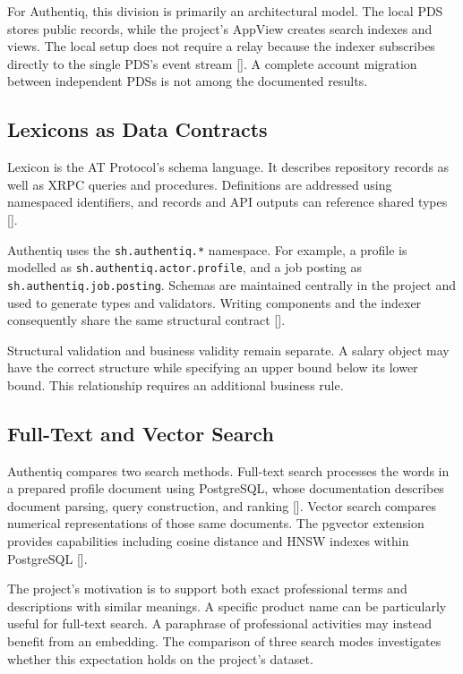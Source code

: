 \documentclass[11pt,a4paper]{article}
\newcommand{\code}[1]{\texttt{#1}}
\newcommand{\reflink}[1]{\hyperlink{ref:#1}{#1}}
\newcommand{\refsep}{}
\newcommand{\refs}[1]{\begingroup
  \gdef\refsep{}%
  \renewcommand*{\do}[1]{\refsep\reflink{##1}\gdef\refsep{, }}%
  [\docsvlist{#1}]\endgroup}
\begin{document}
For Authentiq, this division is primarily an architectural model. The local PDS stores public records, while the project's AppView creates search indexes and views. The local setup does not require a relay because the indexer subscribes directly to the single PDS's event stream \refs{P2,P4}. A complete account migration between independent PDSs is not among the documented results.

\subsection{Lexicons as Data Contracts}

Lexicon is the AT Protocol's schema language. It describes repository records as well as XRPC queries and procedures. Definitions are addressed using namespaced identifiers, and records and API outputs can reference shared types \refs{L2}.

Authentiq uses the \code{sh.authentiq.*} namespace. For example, a profile is modelled as \code{sh.authentiq.actor.profile}, and a job posting as \code{sh.authentiq.job.posting}. Schemas are maintained centrally in the project and used to generate types and validators. Writing components and the indexer consequently share the same structural contract \refs{P3,P4}.

Structural validation and business validity remain separate. A salary object may have the correct structure while specifying an upper bound below its lower bound. This relationship requires an additional business rule.

\subsection{Full-Text and Vector Search}

Authentiq compares two search methods. Full-text search processes the words in a prepared profile document using PostgreSQL, whose documentation describes document parsing, query construction, and ranking \refs{L14}. Vector search compares numerical representations of those same documents. The pgvector extension provides capabilities including cosine distance and HNSW indexes within PostgreSQL \refs{L3}.

The project's motivation is to support both exact professional terms and descriptions with similar meanings. A specific product name can be particularly useful for full-text search. A paraphrase of professional activities may instead benefit from an embedding. The comparison of three search modes investigates whether this expectation holds on the project's dataset.
\end{document}
